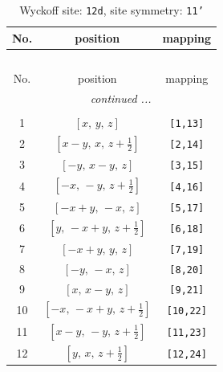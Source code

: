 \documentclass[fleqn,8pt]{jsarticle}
\begin{document}
\begin{longtable}{ccc}
\caption{Wyckoff site: {\tt 12d}, site symmetry: {\tt 11'}}
 \\
 \hline \hline
No. & position & mapping \\ \hline \endfirsthead

\multicolumn{2}{l}{\tablename\ \thetable{}} \\
 \hline \hline
No. & position & mapping \\ \hline \endhead

 \hline \hline
\multicolumn{2}{r}{\footnotesize\it continued ...} \\ \endfoot

 \hline \hline
\multicolumn{2}{r}{} \\ \endlastfoot

1 & $\left[ x,\, y,\, z \right]$ & {\tt [1,13]} \\ \hline
2 & $\left[ x - y,\, x,\, z + \frac{1}{2} \right]$ & {\tt [2,14]} \\ \hline
3 & $\left[ - y,\, x - y,\, z \right]$ & {\tt [3,15]} \\ \hline
4 & $\left[ - x,\, - y,\, z + \frac{1}{2} \right]$ & {\tt [4,16]} \\ \hline
5 & $\left[ - x + y,\, - x,\, z \right]$ & {\tt [5,17]} \\ \hline
6 & $\left[ y,\, - x + y,\, z + \frac{1}{2} \right]$ & {\tt [6,18]} \\ \hline
7 & $\left[ - x + y,\, y,\, z \right]$ & {\tt [7,19]} \\ \hline
8 & $\left[ - y,\, - x,\, z \right]$ & {\tt [8,20]} \\ \hline
9 & $\left[ x,\, x - y,\, z \right]$ & {\tt [9,21]} \\ \hline
10 & $\left[ - x,\, - x + y,\, z + \frac{1}{2} \right]$ & {\tt [10,22]} \\ \hline
11 & $\left[ x - y,\, - y,\, z + \frac{1}{2} \right]$ & {\tt [11,23]} \\ \hline
12 & $\left[ y,\, x,\, z + \frac{1}{2} \right]$ & {\tt [12,24]} \\
\end{longtable}
\end{document}
